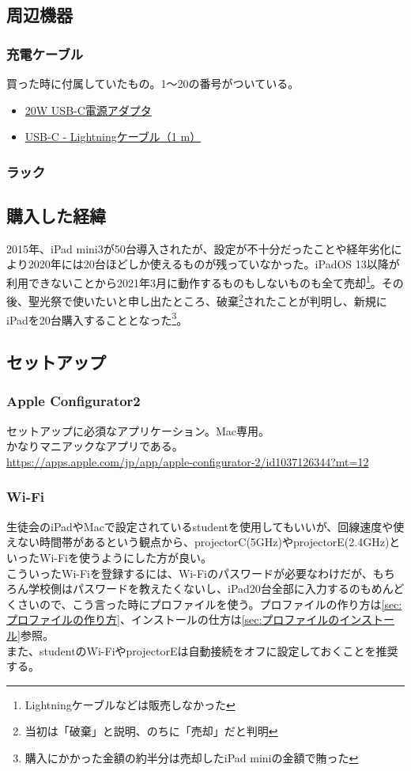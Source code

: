 \documentclass[dvipdfmx,jb5]{jarticle}
\newcommand{\link}[2]{\href{#2}{#1}}
\begin{document}
 \subsection{周辺機器}
  \subsubsection{充電ケーブル}
  買った時に付属していたもの。1〜20の番号がついている。
  \begin{itemize}
   \item \link{20W USB-C電源アダプタ}{https://apple.co/3xeTw5G}
   \item \link{USB-C - Lightningケーブル（1 m）}{https://apple.co/3cGxn6D}
   \end{itemize}
  \subsubsection{ラック}
 \subsection{購入した経緯}
  2015年、iPad mini3が50台導入されたが、設定が不十分だったことや経年劣化により2020年には20台ほどしか使えるものが残っていなかった。iPadOS 13以降が利用できないことから2021年3月に動作するものもしないものも全て売却\footnote{Lightningケーブルなどは販売しなかった}。その後、聖光祭で使いたいと申し出たところ、破棄\footnote{当初は「破棄」と説明、のちに「売却」だと判明}されたことが判明し、新規にiPadを20台購入することとなった\footnote{購入にかかった金額の約半分は売却したiPad miniの金額で賄った}。
 \subsection{セットアップ}\label{sec:iPadのセットアップ}
  \subsubsection{Apple Configurator2}
   セットアップに必須なアプリケーション。Mac専用。\\
   かなりマニアックなアプリである。\\
   \url{https://apps.apple.com/jp/app/apple-configurator-2/id1037126344?mt=12}
  \subsubsection{Wi-Fi}
  生徒会のiPadやMacで設定されているstudentを使用してもいいが、回線速度や使えない時間帯があるという観点から、projectorC(5GHz)やprojectorE(2.4GHz)といったWi-Fiを使うようにした方が良い。\\
  こういったWi-Fiを登録するには、Wi-Fiのパスワードが必要なわけだが、もちろん学校側はパスワードを教えたくないし、iPad20台全部に入力するのもめんどくさいので、こう言った時にプロファイルを使う。プロファイルの作り方は\ref{sec:プロファイルの作り方}、インストールの仕方は\ref{sec:プロファイルのインストール}参照。\\
  また、studentのWi-FiやprojectorEは自動接続をオフに設定しておくことを推奨する。
\end{document}
